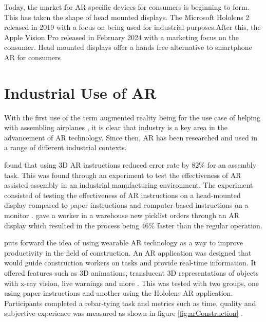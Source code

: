 \documentclass{l4proj}
\begin{document}

Today, the market for AR specific devices for consumers is beginning to form. This has taken the shape of head mounted displays. The Microsoft Hololens 2 \citep{microsoft_hololens_2019} released in 2019 with a focus on being used for industrial purposes.After this, the Apple Vision Pro \citep{apple_apple_2024} released in February 2024 with a marketing focus on the consumer. Head mounted displays offer a hands free alternative to smartphone AR for consumers

\section{Industrial Use of AR}

With the first use of the term augmented reality being for the use case of helping with assembling airplanes \citep{caudell1992augmented}, it is clear that industry is a key area in the advancement of AR technology. Since then, AR has been researched and used in a range of different industrial contexts.

\citet{Tang2004} found that using 3D AR instructions reduced error rate by 82\% for an assembly task. This was found through an experiment to test the effectiveness of AR assisted assembly in an industrial manufacturing environment. The experiment consisted of testing the effectiveness of AR instructions on a head-mounted display compared to paper instructions and computer-based instructions on a monitor \citep{Tang2004}. \citet{upskill_upskill_2017} gave a worker in a warehouse new picklist orders through an AR display which resulted in the process being 46\% faster than the regular operation.

\citet{wu_cognitive_2023} puts forward the idea of using wearable AR technology as a way to improve productivity in the field of construction. An AR application was designed that would guide construction workers on tasks and provide real-time information. It offered features such as 3D animations, translucent 3D representations of objects with x-ray vision, live warnings and more \citep{wu_cognitive_2023}. This was tested with two groups, one using paper instructions and another using the Hololens AR application. Participants completed a rebar-tying task and metrics such as time, quality and subjective experience was measured as shown in figure \ref{fig:arConstruction} \citep{wu_cognitive_2023}. 
\end{document}
